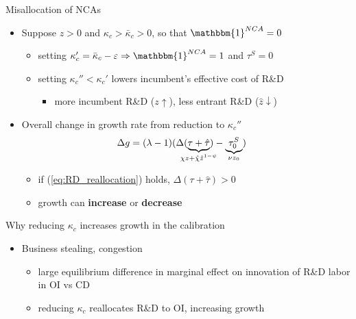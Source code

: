 \documentclass[english,usenames,dvipsnames]{beamer}
\begin{document}
\begin{frame}{Misallocation of NCAs}\label{misallocation_of_nca} 
	\hyperlink{efficiency}{}
	\begin{itemize}
		\item <+-> Suppose $z > 0$ and $\kappa_c > \bar{\kappa}_c > 0$, so that $\mathbbm{1}^{NCA} = 0$ 
		\begin{itemize}
			\item setting $\kappa_c' = \bar{\kappa}_c - \varepsilon \Rightarrow \mathbbm{1}^{NCA} = 1$ and $\tau^S = 0$
			\item setting $\kappa_c'' < \kappa_c'$ lowers incumbent's effective cost of R\&D
			\begin{itemize}
				\item more incumbent R\&D ($z \uparrow$), less entrant R\&D ($\hat{z} \downarrow$)
			\end{itemize}
		\end{itemize}
		\item <+-> Overall change in growth rate from reduction to $\kappa_c''$
		\begin{align*}
			\Delta g  &= (\lambda -1) (\Delta (\underbrace{\tau + \hat{\tau}}_{\mathclap{\chi z + \hat{\chi} \hat{z}^{1-\psi}}}) - \underbrace{\tau^S_0}_{\mathclap{ \nu z_0}})
		\end{align*}
		\begin{itemize}
			\item if (\ref{eq:RD_reallocation}) holds, $\Delta(\tau+ \hat{\tau}) > 0$ 
			\item growth can \alert{\textbf{increase}} or \alert{\textbf{decrease}}  
		\end{itemize}
	\end{itemize}
\end{frame}

\begin{frame}{Why reducing $\kappa_c$ increases growth in the calibration}\label{reducing_kappa_c_intuition}
	\hyperlink{reducing_kappa_c_table}{}
	\begin{itemize}
		\item Business stealing, congestion
		\begin{itemize}
			\item large equilibrium difference in marginal effect on innovation of R\&D labor in OI vs CD
			\item reducing $\kappa_c$ reallocates R\&D to OI, increasing growth
		\end{itemize}
	\end{itemize}
\end{frame}
\end{document}
